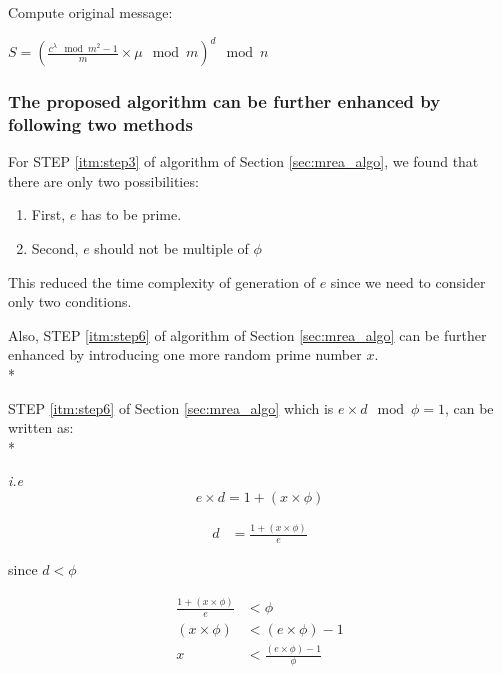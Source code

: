 \documentclass[conference]{IEEEtran}
\begin{document}
Compute original message:
\begin{center}
	$S = (\frac{c^{\lambda}\mod m^{2}-1}{m}\times \mu \mod m)^{d} \mod n$
\end{center}

\par

\subsubsection{\bf The proposed algorithm\cite{securersa} can be further enhanced by following two methods}
\par \par
For STEP \ref{itm:step3} of algorithm of Section \ref{sec:mrea_algo}, we found that there are only two possibilities:

\begin{enumerate}
	\item First, $e$ has to be prime.
	\item Second, $e$ should not be multiple of $\phi$
\end{enumerate}
This reduced the time complexity of generation of $e$ since we need to consider only two conditions.

Also, STEP \ref{itm:step6} of algorithm of Section \ref{sec:mrea_algo} can be further enhanced by introducing one more random prime number $x$. \\*

STEP \ref{itm:step6} of Section \ref{sec:mrea_algo} which is $e \times d \mod \phi = 1$, can be written as:\\* 

\emph{i.e}
\begin{equation}
e \times d = 1 + (x \times \phi)
\end{equation}

\begin{align*}
	d &= \frac{1 + (x\times\phi)}{e}
\end{align*}

since $d < \phi$

\begin{align*}
	\frac{1 + (x \times \phi)}{e} &< \phi \\
	(x \times \phi) &< (e \times \phi) -1 \\
	x &< \frac{(e \times \phi) -1}{\phi} \\
\end{align*}
\end{document}
